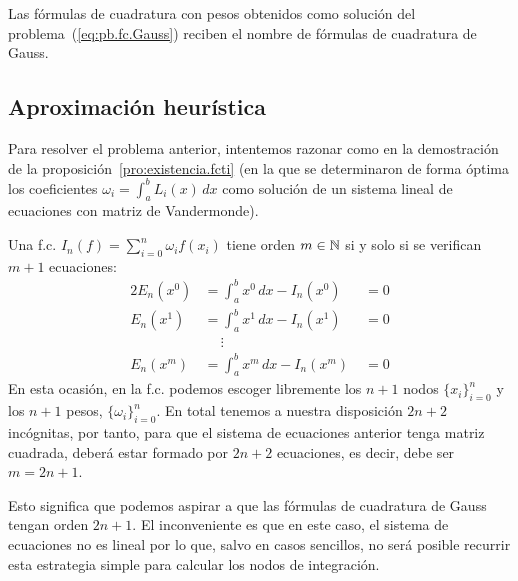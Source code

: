 \begin{definition}
  Las fórmulas de cuadratura con pesos obtenidos como solución del
  problema~(\ref{eq:pb.fc.Gauss}) reciben el nombre de fórmulas de
  cuadratura de Gauss.
\end{definition}
\subsection*{Aproximación heurística}
Para resolver el problema anterior, intentemos razonar como en la
demostración de la proposición~\ref{pro:existencia.fcti} (en la que se
determinaron de forma óptima los coeficientes $\omega_i=\int_a^b
L_i(x)\, dx$ como solución de un sistema lineal de ecuaciones con
matriz de Vandermonde).


Una f.c. $I_n(f)=\sum_{i=0}^n \omega_i f(x_i)$ tiene orden $m\in\operatorname{{\mathbb N}}$
si y solo si se verifican $m+1$ ecuaciones:
\begin{alignat*}{2}
  E_n(x^0)&=\int_a^b x^0\, dx -I_n(x^0)&\; =0 \\
  E_n(x^1)&=\int_a^b x^1\, dx -I_n(x^1)&\; =0 \\
  &~\quad\vdots \\
  E_n(x^m)&=\int_a^b x^m\, dx -I_n(x^m)&\; =0
\end{alignat*}
En esta ocasión, en la f.c. podemos escoger libremente los $n+1$ nodos
$\{x_i\}_{i=0}^n$ y los $n+1$ pesos, $\{\omega_i\}_{i=0}^n$. En total
tenemos a nuestra disposición $2n+2$ incógnitas, por tanto, para que
el sistema de ecuaciones anterior tenga matriz cuadrada, deberá estar
formado por $2n+2$ ecuaciones, es decir, debe ser $m=2n+1$.

Esto significa que podemos aspirar a que las fórmulas de cuadratura de
Gauss tengan orden $2n+1$. El inconveniente es que en este caso, el
sistema de ecuaciones no es lineal por lo que, salvo en casos
sencillos, no será posible recurrir esta estrategia simple
para calcular los nodos de integración.


